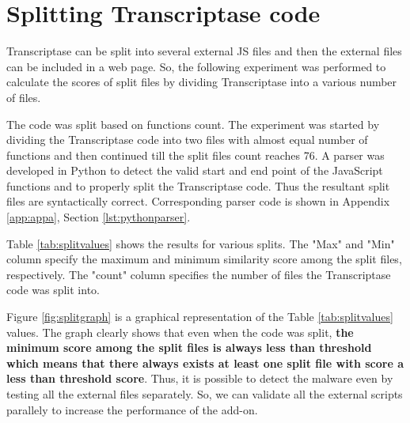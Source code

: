 \section{Splitting Transcriptase code}

Transcriptase can be split into several external JS files and then the external files can be included in a web page. So, the following experiment was performed to calculate the scores of split files by dividing Transcriptase into a various number of files.

The code was split based on functions count. The experiment was started by dividing the Transcriptase code into two files with almost equal number of functions and then continued till the split files count reaches 76. A parser was developed in Python to detect the valid start and end point of the JavaScript functions and to properly split the Transcriptase code. Thus the resultant split files are syntactically correct. Corresponding parser code is shown in Appendix \ref{app:appa}, Section \ref{lst:pythonparser}.

Table \ref{tab:splitvalues} shows the results for various splits. The "Max" and "Min" column specify the maximum and minimum similarity score among the split files, respectively. The "count" column specifies the number of files the Transcriptase code was split into.

Figure \ref{fig:splitgraph} is a graphical representation of the Table \ref{tab:splitvalues} values. The graph clearly shows that even when the code was split, \textbf{the minimum score among the split files is always less than threshold which means that there always exists at least one split file with score a less than threshold score}. Thus, it is possible to detect the malware even by testing all the external files separately. So, we can validate all the external scripts parallely to increase the performance of the add-on.


